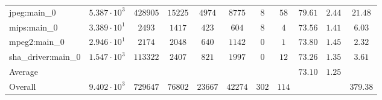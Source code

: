 \begin{tabular}{|l|c|c|c|c|c|c|c|c|c|c|}
jpeg:main\_0            & $ 5.387 \cdot 10^{3} $ & $ 428905 $ & $ 15225 $ & $ 4974  $ & $ 8775  $ & $ 8   $ & $ 58  $ & $ 79.61       $ & $ 2.44    $ & $ 21.48   $ \\
mips:main\_0            & $ 3.389 \cdot 10^{1} $ & $ 2493   $ & $ 1417  $ & $ 423   $ & $ 604   $ & $ 8   $ & $ 4   $ & $ 73.56       $ & $ 1.41    $ & $ 6.03    $ \\
mpeg2:main\_0           & $ 2.946 \cdot 10^{1} $ & $ 2174   $ & $ 2048  $ & $ 640   $ & $ 1142  $ & $ 0   $ & $ 1   $ & $ 73.80       $ & $ 1.45    $ & $ 2.32    $ \\
sha\_driver:main\_0     & $ 1.547 \cdot 10^{3} $ & $ 113322 $ & $ 2407  $ & $ 821   $ & $ 1997  $ & $ 0   $ & $ 12  $ & $ 73.26       $ & $ 1.35    $ & $ 3.61    $ \\
\hline
Average                 & $                    $ & $        $ & $       $ & $       $ & $       $ & $     $ & $     $ & $ 73.10       $ & $ 1.25    $ & $         $ \\
\hline
Overall                 & $ 9.402 \cdot 10^{3} $ & $ 729647 $ & $ 76802 $ & $ 23667 $ & $ 42274 $ & $ 302 $ & $ 114 $ & $             $ & $         $ & $ 379.38  $ \\
\hline
\end{tabular}
